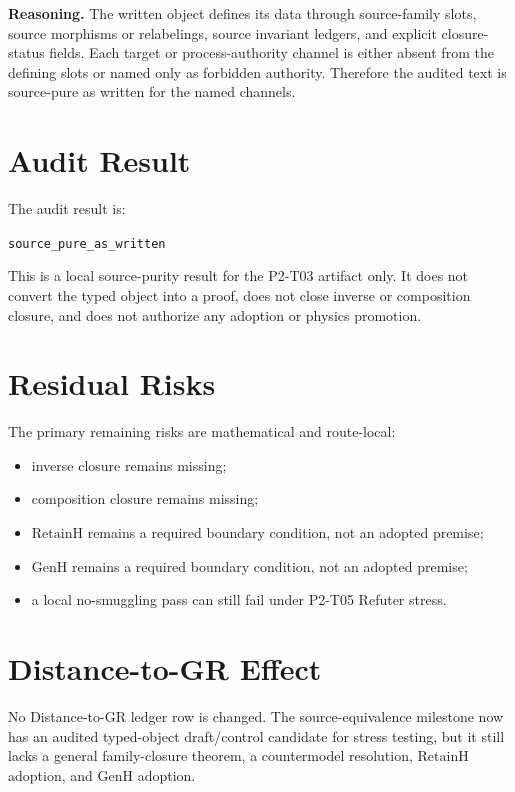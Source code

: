 \documentclass[11pt]{article}
\newcommand{\RetainH}{\mathrm{RetainH}}
\newcommand{\GenH}{\mathrm{GenH}}
\begin{document}
\textbf{Reasoning.} The written object defines its data through source-family
slots, source morphisms or relabelings, source invariant ledgers, and explicit
closure-status fields. Each target or process-authority channel is either
absent from the defining slots or named only as forbidden authority. Therefore
the audited text is source-pure as written for the named channels.

\section*{Audit Result}

The audit result is:

\begin{center}
\texttt{source\_pure\_as\_written}
\end{center}

This is a local source-purity result for the P2-T03 artifact only. It does not
convert the typed object into a proof, does not close inverse or composition
closure, and does not authorize any adoption or physics promotion.

\section*{Residual Risks}

The primary remaining risks are mathematical and route-local:

\begin{itemize}
  \item inverse closure remains missing;
  \item composition closure remains missing;
  \item \(\RetainH\) remains a required boundary condition, not an adopted
  premise;
  \item \(\GenH\) remains a required boundary condition, not an adopted premise;
  \item a local no-smuggling pass can still fail under P2-T05 Refuter stress.
\end{itemize}

\section*{Distance-to-GR Effect}

No Distance-to-GR ledger row is changed. The source-equivalence milestone now
has an audited typed-object draft/control candidate for stress testing, but it
still lacks a general family-closure theorem, a countermodel resolution,
\(\RetainH\) adoption, and \(\GenH\) adoption.
\end{document}
